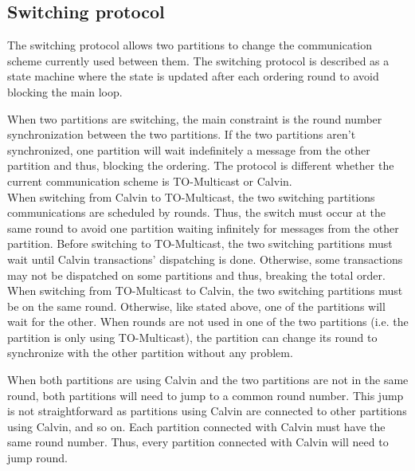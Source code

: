 \documentclass[a4paper, 10pt]{article}
\newcommand{\GE}{TO-Multicast}
\newcommand{\PE}{Calvin}
\newcommand{\Li}[1]{\mynote{Li}{#1}{blue}}
\newcommand{\Ch}[1]{\mynote{Ch}{#1}{green}}
\begin{document}
   \subsection{Switching protocol}

   The switching protocol allows two partitions to change the communication scheme currently
   used between them. The switching protocol is described as a state machine where the state is updated
   after each ordering round to avoid blocking the main loop.

   When two partitions are switching, the main constraint is the round number synchronization between
   the two partitions. If the two partitions aren't synchronized, one partition will wait
   indefinitely a message from the other partition and thus, blocking the ordering.
   The protocol is different whether the current communication scheme is \GE{} or \PE{}. \\

   When switching from \PE{} to \GE{}, the two switching partitions communications are
   scheduled by rounds. Thus, the switch must occur at the same round to avoid one partition
   waiting infinitely for messages from the other partition. Before switching to \GE{},
   the two switching partitions must wait until \PE{} transactions' dispatching is done.
   Otherwise, some transactions may not be dispatched on some partitions and thus, breaking
   the total order. \\

   When switching from \GE{} to \PE{}, the two switching partitions must be on the same
   round. Otherwise, like stated above, one of the partitions will wait for the other.
   When rounds are not used in one of the two partitions (i.e. the partition is
   only using \GE{}), the partition can change its round to synchronize with the other
   partition without any problem.

   When both partitions are using \PE{} and the two partitions are not in the
   same round, both partitions will need to jump to a common round number. This
   jump is not straightforward as partitions using \PE{} are connected to
   other partitions using \PE{}, and so on. Each partition connected with \PE{}
   must have the same round number. Thus, every partition connected with \PE{}
   will need to jump round.

\end{document}
